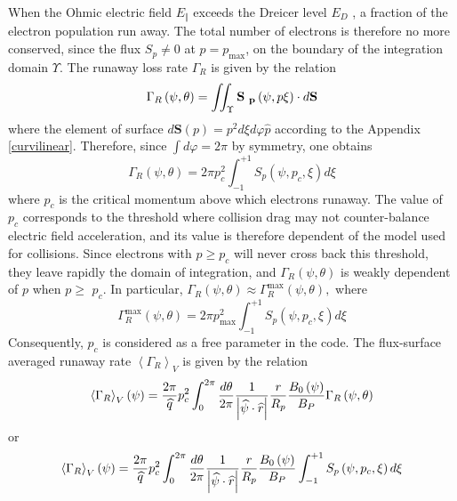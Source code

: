 When the Ohmic electric field $E_{\Vert }$ exceeds the Dreicer level $E_{D}$%
, a fraction of the electron population run away. The total number of
electrons is therefore no more conserved, since the flux $S_{p}\neq 0$ at $%
p=p_{\max }$, on the boundary of the integration domain $\Upsilon $. The
runaway loss rate $\Gamma _{R}$ is given by the relation
\begin{equation}
\Gamma _{R}\left( \psi ,\theta \right) =\iint_{\Upsilon }\mathbf{S}_{\mathbf{%
\ p}}\left( \psi ,p\xi \right) \cdot d\mathbf{S}
\end{equation}
where the element of surface $d\mathbf{S}\left( p\right) =p^{2}d\xi d\varphi
\widehat{p}$ according to the Appendix \ref{curvilinear}. Therefore, since $%
\int d\varphi =2\pi $ by symmetry, one obtains
\begin{equation}
\Gamma _{R}\left( \psi ,\theta \right) =2\pi
p_{c}^{2}\int_{-1}^{+1}S_{p}\left( \psi ,p_{c},\xi \right) d\xi
\end{equation}
where $p_{c}$ is the critical momentum above which electrons runaway. The
value of $p_{c}$ corresponds to the threshold where collision drag may not
counter-balance electric field acceleration, and its value is therefore
dependent of the model used for collisions. Since electrons with $p\geq
p_{c} $ will never cross back this threshold, they leave rapidly the domain
of integration, and $\Gamma _{R}\left( \psi ,\theta \right) $ is weakly
dependent of $p$ when $p\geq $ $p_{c}$. In particular, $\Gamma _{R}\left(
\psi ,\theta \right) \approx \Gamma _{R}^{\max }\left( \psi ,\theta \right)
, $ where
\begin{equation}
\Gamma _{R}^{\max }\left( \psi ,\theta \right) =2\pi p_{\max
}^{2}\int_{-1}^{+1}S_{p}\left( \psi ,p_{c},\xi \right) d\xi
\end{equation}
Consequently, $p_{c}$ is considered as a free parameter in the code. The
flux-surface averaged runaway rate $\left\langle \Gamma _{R}\right\rangle
_{V}$ is given by the relation
\begin{equation}
\left\langle \Gamma _{R}\right\rangle _{V}\left( \psi \right) =\frac{2\pi }{%
\widehat{q}}p_{c}^{2}\int_{0}^{2\pi }\frac{d\theta }{2\pi }\frac{1}{\left|
\widehat{\psi }\cdot \widehat{r}\right| }\frac{r}{R_{p}}\frac{B_{0}\left(
\psi \right) }{B_{P}}\Gamma _{R}\left( \psi ,\theta \right)
\end{equation}
or
\begin{equation}
\left\langle \Gamma _{R}\right\rangle _{V}\left( \psi \right) =\frac{2\pi }{%
\widehat{q}}p_{c}^{2}\int_{0}^{2\pi }\frac{d\theta }{2\pi }\frac{1}{\left|
\widehat{\psi }\cdot \widehat{r}\right| }\frac{r}{R_{p}}\frac{B_{0}\left(
\psi \right) }{B_{P}}\int_{-1}^{+1}S_{p}\left( \psi ,p_{c},\xi \right) d\xi
\end{equation}

